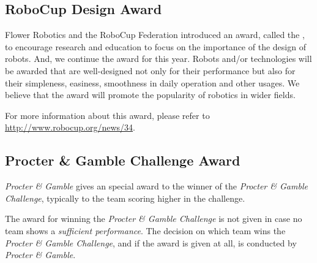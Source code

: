 \subsection{RoboCup Design Award}
\label{award:design}
Flower Robotics and the RoboCup Federation introduced an award, called the , to encourage research and education to focus on the importance of the design of robots. And, we continue the award for this year. Robots and/or technologies will be awarded that are well-designed not only for their performance but also for their simpleness, easiness, smoothness in daily operation and other usages. We believe that the award will promote the popularity of robotics in wider fields.

For more information about this award, please refer to \url{http://www.robocup.org/news/34}.


\subsection{Procter \& Gamble Challenge Award}
\label{award:skill}
\textit{Procter \& Gamble} gives an special award to the winner of the \textit{Procter \& Gamble Challenge}, typically to the team scoring higher in the challenge.

The award for winning the \textit{Procter \& Gamble Challenge} is not given in case no team shows a \emph{sufficient performance}. The decision on which team wins the \textit{Procter \& Gamble Challenge}, and if the award is given at all, is conducted by \textit{Procter \& Gamble}.
